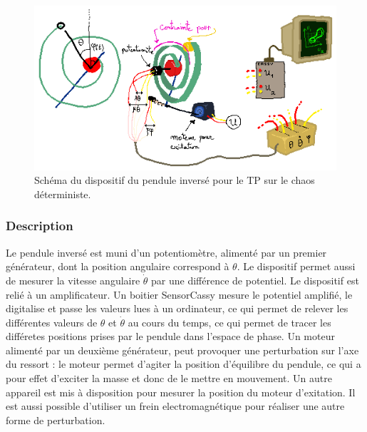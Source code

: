 \documentclass[a4paper,12pt,oneside]{article}
\begin{document}
\begin{figure}[h!]
  \begin{center}
  \includegraphics[width=1\linewidth,angle=0]{./figures/pendule.png}
  \caption{Schéma du dispositif du pendule inversé pour le TP sur le chaos déterministe.} \label{fig:pendule1}
  \end{center}
\end{figure}

\subsubsection{Description}

Le pendule inversé est muni d'un potentiomètre, alimenté par un premier générateur, dont la position angulaire correspond à $\theta$. Le dispositif permet aussi de mesurer la vitesse angulaire $\dot{\theta}$ par une différence de potentiel. Le dispositif est relié à un amplificateur.
Un boitier SensorCassy mesure le potentiel amplifié, le digitalise et passe les valeurs lues à un ordinateur, ce qui permet de relever les différentes valeurs de $\theta$ et $\dot{\theta}$ au cours du temps, ce qui permet de tracer les différetes positions prises par le pendule dans l'espace de phase.
Un moteur alimenté par un deuxième générateur, peut provoquer une perturbation sur l'axe du ressort : le moteur permet d'agiter la position d'équilibre du pendule, ce qui a pour effet d'exciter la masse et donc de le mettre en mouvement. Un autre appareil est mis à disposition pour mesurer la position du moteur d'exitation.
Il est aussi possible d'utiliser un frein electromagnétique pour réaliser une autre forme de perturbation.
\end{document}
